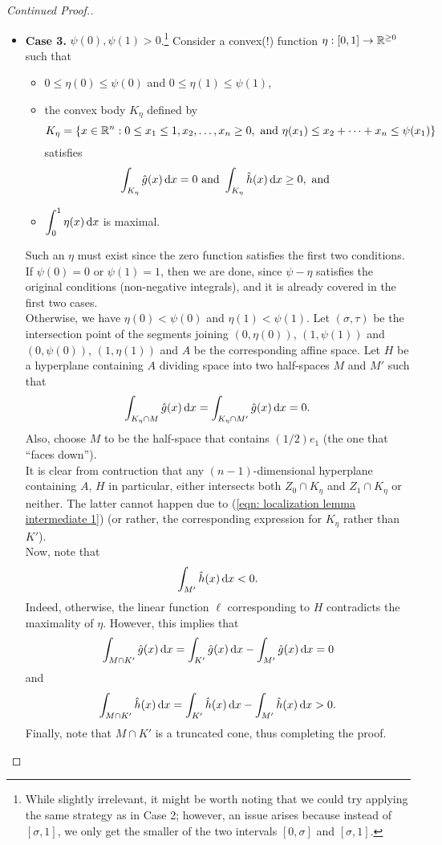 \begin{proof}[Continued Proof.]
\begin{itemize}
		\item \textbf{Case 3.} $\psi(0),\psi(1)>0$.\footnote{While slightly irrelevant, it might be worth noting that we could try applying the same strategy as in Case 2; however, an issue arises because instead of $[\sigma,1]$, we only get the smaller of the two intervals $[0,\sigma]$ and $[\sigma,1]$.} Consider a convex(!) function $\eta:[0,1]\to\mathbb{R}^{\geq 0}$ such that
		\begin{itemize}
			\item $0\leq\eta(0)\leq\psi(0)$ and $0\leq\eta(1)\leq\psi(1)$,
			\item the convex body $K_\eta$ defined by
			\[ K_\eta = \{ x\in\mathbb{R}^n : 0\leq x_1\leq 1, x_2,\ldots,x_n\geq 0, \text{ and } \eta(x_1)\leq x_2+\cdots+x_n\leq\psi(x_1) \} \]
			satisfies
			\[ \int_{K_\eta} \hat{g}(x)\operatorname{d}\!{x} = 0 \text{ and } \int_{K_\eta} \hat{h}(x)\operatorname{d}\!{x}\geq 0, \text{ and } \]
			\item $\displaystyle\int_0^1 \eta(x)\operatorname{d}\!{x}$ is maximal.
		\end{itemize}
		Such an $\eta$ must exist since the zero function satisfies the first two conditions.\\
		If $\psi(0)=0$ or $\psi(1)=1$, then we are done, since $\psi-\eta$ satisfies the original conditions (non-negative integrals), and it is already covered in the first two cases.\\
		Otherwise, we have $\eta(0)<\psi(0)$ and $\eta(1)<\psi(1)$. Let $(\sigma,\tau)$ be the intersection point of the segments joining $(0,\eta(0))$, $(1,\psi(1))$ and $(0,\psi(0))$, $(1,\eta(1))$ and $A$ be the corresponding affine space. Let $H$ be a hyperplane containing $A$ dividing space into two half-spaces $M$ and $M'$ such that
		\[ \int_{K_\eta \cap M} \hat{g}(x)\operatorname{d}\!{x} = \int_{K_\eta \cap M'} \hat{g}(x)\operatorname{d}\!{x} = 0.  \]
		Also, choose $M$ to be the half-space that contains $(1/2) e_1$ (the one that ``faces down'').\\
		It is clear from contruction that any $(n-1)$-dimensional hyperplane containing $A$, $H$ in particular, either intersects both $Z_0\cap K_\eta$ and $Z_1\cap K_\eta$ or neither. The latter cannot happen due to (\ref{eqn: localization lemma intermediate 1}) (or rather, the corresponding expression for $K_\eta$ rather than $K'$).\\
		Now, note that
		\[ \int_{M'} \hat{h}(x)\operatorname{d}\!{x} < 0. \]
		Indeed, otherwise, the linear function $\ell$ corresponding to $H$ contradicts the maximality of $\eta$. However, this implies that
		\[ \int_{M\cap K'} \hat{g}(x)\operatorname{d}\!{x} = \int_{K'} \hat{g}(x)\operatorname{d}\!{x} - \int_{M'}\hat{g}(x)\operatorname{d}\!{x} = 0 \]
		and
		\[ \int_{M\cap K'} \hat{h}(x)\operatorname{d}\!{x} = \int_{K'} \hat{h}(x)\operatorname{d}\!{x} - \int_{M'}\hat{h}(x)\operatorname{d}\!{x} > 0. \]
		Finally, note that $M\cap K'$ is a truncated cone, thus completing the proof.\qedhere
	\end{itemize}
\end{proof}

